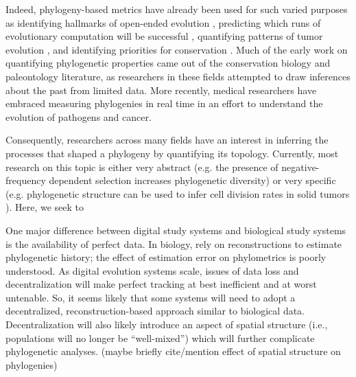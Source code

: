 Indeed, phylogeny-based metrics have already been used for such varied purposes as identifying hallmarks of open-ended evolution \citep{dolsonMODESToolboxMeasurements2019}, predicting which runs of evolutionary computation will be successful \citep{hernandezWhatCanPhylogenetic2022a, shahbandeganUntanglingPhylogeneticDiversity2022a}, quantifying patterns of tumor evolution \citep{scottInferringTumorProliferative2020, lewinsohnStatedependentEvolutionaryModels2023}, and identifying priorities for conservation \citep{forestPreservingEvolutionaryPotential2007}. Much of the early work on quantifying phylogenetic properties came out of the conservation biology and paleontology literature, as researchers in these fields attempted to draw inferences about the past from limited data. More recently, medical researchers have embraced measuring phylogenies in real time in an effort to understand the evolution of pathogens and cancer. 

Consequently, researchers across many fields have an interest in inferring the processes that shaped a phylogeny by quantifying its topology. Currently, most research on this topic is either very abstract (e.g. the presence of negative-frequency dependent selection increases phylogenetic diversity) or very specific (e.g. phylogenetic structure can be used to infer cell division rates in solid tumors \citep{lewinsohnStatedependentEvolutionaryModels2023}). Here, we seek to 


One major difference between digital study systems and biological study systems is the availability of perfect data.
In biology, rely on reconstructions to estimate phylogenetic history; the effect of estimation error on phylometrics is poorly understood.
As digital evolution systems scale, issues of data loss and decentralization will make perfect tracking at best inefficient and at worst untenable.
So, it seems likely that some systems will need to adopt a decentralized, reconstruction-based approach similar to biological data.
Decentralization will also likely introduce an aspect of spatial structure (i.e., populations will no longer be ``well-mixed'') which will further complicate phylogenetic analyses.
(maybe briefly cite/mention effect of spatial structure on phylogenies)

